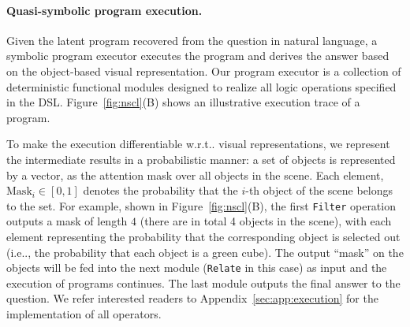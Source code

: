 \documentclass{article} %
\makeatletter
\newcommand{\fig}[1]{Figure~\ref{#1}}
\DeclareRobustCommand\onedot{\futurelet\@let@token\@onedot}
\def\@onedot{\ifx\@let@token.\else.\null\fi\xspace}
\def\ie{i.e\onedot} \def\Ie{I.e\onedot}
\def\wrt{w.r.t\onedot} \def\dof{d.o.f\onedot}
\newcommand{\myparagraph}[1]{\vspace{-3pt}\paragraph{#1}}
\makeatother
\begin{document}
%

%

\myparagraph{Quasi-symbolic program execution.}

Given the latent program recovered from the question in natural language, a symbolic program executor executes the program and derives the answer based on the object-based visual representation. Our program executor is a collection of deterministic functional modules designed to realize all logic operations specified in the DSL. \fig{fig:nscl}(B) shows an illustrative execution trace of a program.

To make the execution differentiable \wrt visual representations, we represent the intermediate results in a probabilistic manner: a set of objects is represented by a vector, as the attention mask over all objects in the scene. Each element, $\mathrm{Mask}_i \in [0, 1]$ denotes the probability that the $i$-th object of the scene belongs to the set.
For example, shown in \fig{fig:nscl}(B), the first \texttt{Filter} operation outputs a mask of length $4$ (there are in total 4 objects in the scene), with each element representing the probability that the corresponding object is selected out (\ie, the probability that each object is a green cube). The output ``mask'' on the objects will be fed into the next module (\texttt{Relate} in this case) as input and the execution of programs continues. The last module outputs the final answer to the question. We refer interested readers to Appendix~\ref{sec:app:execution} for the implementation of all operators.

%

%
\end{document}
